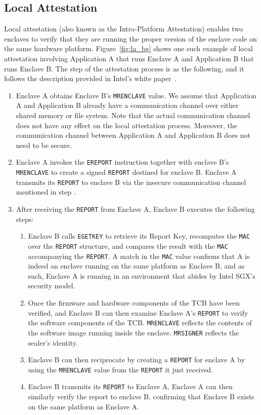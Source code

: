 \subsection{Local Attestation}
\label{ch:background:SGX:local}

Local attestation (also known as the Intra-Platform Attestation) enables two enclaves to verify that they are running the proper version of the enclave code on the same hardware platform. Figure~\ref{fig:la_bg} shows one such example of local attestation involving Application A that runs Enclave A and Application B that runs Enclave B. The step of the attestation process is as the following, and it follows the description provided in Intel's white paper~\cite{attestation_primitive_all}.

\begin{enumerate}
  \item [\one] Enclave A obtains Enclave B's \texttt{MRENCLAVE} value. We assume that Application A and Application B already have a communication channel over either shared memory or file system. Note that the actual communication channel does not have any effect on the local attestation process. Moreover, the communication channel between Application A and Application B does not need to be secure.
  \item [\two] Enclave A invokes the \texttt{EREPORT} instruction together with enclave B's \texttt{MRENCLAVE} to create a signed \texttt{REPORT} destined for enclave B. Enclave A transmits its \texttt{REPORT} to enclave B via the insecure communication channel mentioned in step \one.
  \item [\three] After receiving the \texttt{REPORT} from Enclave A, Enclave B executes the following steps:
  
   \begin{enumerate}
     \item  Enclave B calls \texttt{EGETKEY} to retrieve its Report Key, recomputes the \texttt{MAC} over the \texttt{REPORT} structure, and compares the result with the \texttt{MAC} accompanying the \texttt{REPORT}. A match in the \texttt{MAC} value confirms that A is indeed an enclave running on the same platform as Enclave B, and as such, Enclave A is running in an environment that abides by Intel SGX's security model.
     \item Once the firmware and hardware components of the TCB have been verified, and Enclave B can then examine Enclave A's \texttt{REPORT} to verify the software components of the TCB. \texttt{MRENCLAVE} reflects the contents of the software image running inside the enclave. \texttt{MRSIGNER} reflects the sealer's identity.
     \item Enclave B can then reciprocate by creating a \texttt{REPORT} for enclave A by using the \texttt{MRENCLAVE} value from the \texttt{REPORT} it just received.
     \item Enclave B transmits its \texttt{REPORT} to Enclave A. Enclave A can then similarly verify the report to enclave B, confirming that Enclave B exists on the same platform as Enclave A.
   \end{enumerate}
   
\end{enumerate}

